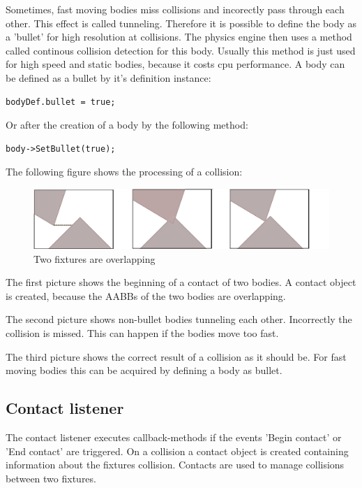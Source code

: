 \documentclass[10pt,a4paper,DIV=11]{scrreprt}
\begin{document}
Sometimes, fast moving bodies miss collisions and incorectly pass through each other. This effect is called tunneling. Therefore it is possible to define the body as a 'bullet' for high resolution at collisions. The physics engine then uses a method called continous collision detection\cite{ccd} for this body. Usually this method is just used for high speed and static bodies, because it costs cpu performance. 
A body can be defined as a bullet by it's definition instance:

\begin{lstlisting}[caption={Define fixture as bullet before creation},label=lst:fixture-bullet-before]
bodyDef.bullet = true;
\end{lstlisting}

Or after the creation of a body by the following method:

\begin{lstlisting}[caption={Define fixture as bullet after creation},label=lst:fixture-bullet-after]
body->SetBullet(true);
\end{lstlisting}

The following figure shows the processing of a collision:

\begin{center}
	\begin{figure}[H]
		\centering
		\includegraphics[width=1.0\textwidth,scale=1.0]{files/fixtures-overlap.png}
		\caption{Two fixtures are overlapping \cite{iforce}}
		\label{fig:fixture-overlap}
	\end{figure}
\end{center}

The first picture shows the beginning of a contact of two bodies. A contact object is created, because the AABBs of the two bodies are overlapping.

The second picture shows non-bullet bodies tunneling each other. Incorrectly the collision is missed. This can happen if the bodies move too fast.

The third picture shows the correct result of a collision as it should be. For fast moving bodies this can be acquired by defining a body as bullet.

\subsection{Contact listener}
The contact listener executes callback-methods if the events 'Begin contact' or 'End contact' are triggered.
On a collision a contact object is created containing information about the fixtures collision.
Contacts are used to manage collisions between two fixtures.
\end{document}
